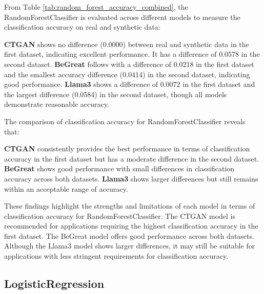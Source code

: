From Table \ref{tab:random_forest_accuracy_combined},  the RandomForestClassifier is evaluated across different models to measure the classification accuracy on real and synthetic data:

\textbf{CTGAN} shows no difference (0.0000) between real and synthetic data in the first dataset, indicating excellent performance. It has a difference of 0.0578 in the second dataset.
\textbf{BeGreat} follows with a difference of 0.0218 in the first dataset and the smallest accuracy difference (0.0414) in the second dataset, indicating good performance.
\textbf{Llama3} shows a difference of 0.0072 in the first dataset and the largest difference (0.0584) in the second dataset, though all models demonstrate reasonable accuracy.


\vspace{0.5cm}

The comparison of classification accuracy for RandomForestClassifier reveals that:

\textbf{CTGAN} consistently provides the best performance in terms of classification accuracy in the first dataset but has a moderate difference in the second dataset.
\textbf{BeGreat} shows good performance with small differences in classification accuracy across both datasets.
\textbf{Llama3} shows larger differences but still remains within an acceptable range of accuracy.


\vspace{0.5cm}

These findings highlight the strengths and limitations of each model in terms of classification accuracy for RandomForestClassifier. The CTGAN model is recommended for applications requiring the highest classification accuracy in the first dataset. The BeGreat model offers good performance across both datasets. Although the Llama3 model shows larger differences, it may still be suitable for applications with less stringent requirements for classification accuracy.









\subsection{LogisticRegression}

